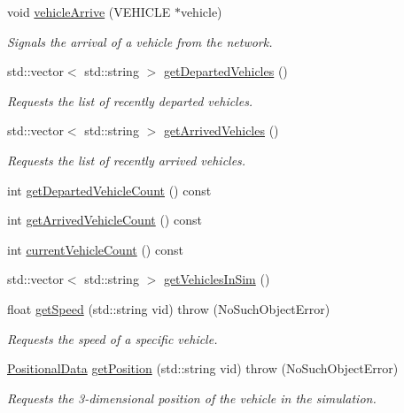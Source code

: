 \begin{DoxyCompactItemize}
void \hyperlink{classtraci__api_1_1_vehicle_manager_a336d2616be8e4e0c9da5d29d7f122ad6}{vehicle\+Arrive} (V\+E\+H\+I\+C\+LE $\ast$vehicle)
\begin{DoxyCompactList}\small\item\em Signals the arrival of a vehicle from the network. \end{DoxyCompactList}\item 
std\+::vector$<$ std\+::string $>$ \hyperlink{classtraci__api_1_1_vehicle_manager_ae88de975fe459842df9a412c552641ea}{get\+Departed\+Vehicles} ()
\begin{DoxyCompactList}\small\item\em Requests the list of recently departed vehicles. \end{DoxyCompactList}\item 
std\+::vector$<$ std\+::string $>$ \hyperlink{classtraci__api_1_1_vehicle_manager_a5ae11ca161f1e9635142a1cdd40417ca}{get\+Arrived\+Vehicles} ()
\begin{DoxyCompactList}\small\item\em Requests the list of recently arrived vehicles. \end{DoxyCompactList}\item 
int \hyperlink{classtraci__api_1_1_vehicle_manager_a707b94f1d1f82a35263ae130a0573f77}{get\+Departed\+Vehicle\+Count} () const
\item 
int \hyperlink{classtraci__api_1_1_vehicle_manager_a193c8fa0b8778c496b23fc114653ebfa}{get\+Arrived\+Vehicle\+Count} () const
\item 
int \hyperlink{classtraci__api_1_1_vehicle_manager_a97816bd56b6f2e6949d175de86c712d6}{current\+Vehicle\+Count} () const
\item 
std\+::vector$<$ std\+::string $>$ \hyperlink{classtraci__api_1_1_vehicle_manager_ae70d2421d4a96ab7601dabb6fcc512b2}{get\+Vehicles\+In\+Sim} ()
\item 
float \hyperlink{classtraci__api_1_1_vehicle_manager_aa5f5a8c13bdd6b1407da5b5ffb6a8559}{get\+Speed} (std\+::string vid)  throw (\+No\+Such\+Object\+Error)
\begin{DoxyCompactList}\small\item\em Requests the speed of a specific vehicle. \end{DoxyCompactList}\item 
\hyperlink{class_positional_data}{Positional\+Data} \hyperlink{classtraci__api_1_1_vehicle_manager_ad00a8d49736c7806f0d363d641b7f467}{get\+Position} (std\+::string vid)  throw (\+No\+Such\+Object\+Error)
\begin{DoxyCompactList}\small\item\em Requests the 3-\/dimensional position of the vehicle in the simulation. \end{DoxyCompactList}\item 

\end{DoxyCompactItemize}

